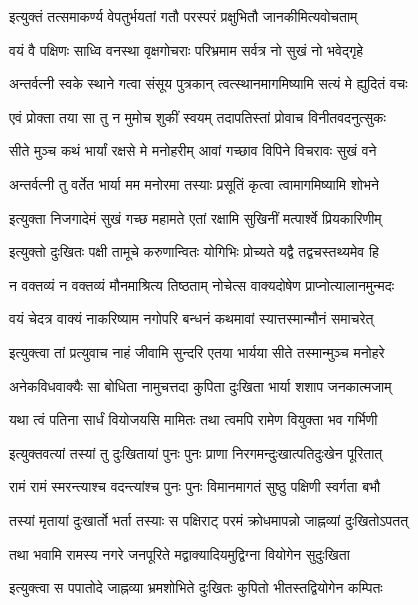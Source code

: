 \twolineshloka
{इत्युक्तं तत्समाकर्ण्य वेपतुर्भयतां गतौ}
{परस्परं प्रक्षुभितौ जानकीमित्यवोचताम्}%

\twolineshloka
{वयं वै पक्षिणः साध्वि वनस्था वृक्षगोचराः}
{परिभ्रमाम सर्वत्र नो सुखं नो भवेद्गृहे}%

\twolineshloka
{अन्तर्वत्नी स्वके स्थाने गत्वा संसूय पुत्रकान्}
{त्वत्स्थानमागमिष्यामि सत्यं मे ह्युदितं वचः}%

\twolineshloka
{एवं प्रोक्ता तया सा तु न मुमोच शुकीं स्वयम्}
{तदापतिस्तां प्रोवाच विनीतवदनुत्सुकः}%

\twolineshloka
{सीते मुञ्च कथं भार्यां रक्षसे मे मनोहरीम्}
{आवां गच्छाव विपिने विचरावः सुखं वने}%

\twolineshloka
{अन्तर्वत्नी तु वर्तेत भार्या मम मनोरमा}
{तस्याः प्रसूतिं कृत्वा त्वामागमिष्यामि शोभने}%

\twolineshloka
{इत्युक्ता निजगादेमं सुखं गच्छ महामते}
{एतां रक्षामि सुखिनीं मत्पार्श्वे प्रियकारिणीम्}%

\twolineshloka
{इत्युक्तो दुःखितः पक्षी तामूचे करुणान्वितः}
{योगिभिः प्रोच्यते यद्वै तद्वचस्तथ्यमेव हि}%

\twolineshloka
{न वक्तव्यं न वक्तव्यं मौनमाश्रित्य तिष्ठताम्}
{नोचेत्स वाक्यदोषेण प्राप्नोत्यालानमुन्मदः}%

\twolineshloka
{वयं चेदत्र वाक्यं नाकरिष्याम नगोपरि}
{बन्धनं कथमावां स्यात्तस्मान्मौनं समाचरेत्}%

\twolineshloka
{इत्युक्त्वा तां प्रत्युवाच नाहं जीवामि सुन्दरि}
{एतया भार्यया सीते तस्मान्मुञ्च मनोहरे}%

\twolineshloka
{अनेकविधवाक्यैः सा बोधिता नामुचत्तदा}
{कुपिता दुःखिता भार्या शशाप जनकात्मजाम्}%

\twolineshloka
{यथा त्वं पतिना सार्धं वियोजयसि मामितः}
{तथा त्वमपि रामेण वियुक्ता भव गर्भिणी}%

\twolineshloka
{इत्युक्तवत्यां तस्यां तु दुःखितायां पुनः पुनः}
{प्राणा निरगमन्दुःखात्पतिदुःखेन पूरितात्}%

\twolineshloka
{रामं रामं स्मरन्त्याश्च वदन्त्यांश्च पुनः पुनः}
{विमानमागतं सुष्ठु पक्षिणी स्वर्गता बभौ}%

\twolineshloka
{तस्यां मृतायां दुःखार्तो भर्ता तस्याः स पक्षिराट्}
{परमं क्रोधमापन्नो जाह्नव्यां दुःखितोऽपतत्}%

\twolineshloka
{तथा भवामि रामस्य नगरे जनपूरिते}
{मद्वाक्यादियमुद्विग्ना वियोगेन सुदुःखिता}%

\twolineshloka
{इत्युक्त्वा स पपातोदे जाह्नव्या भ्रमशोभिते}
{दुःखितः कुपितो भीतस्तद्वियोगेन कम्पितः}%

